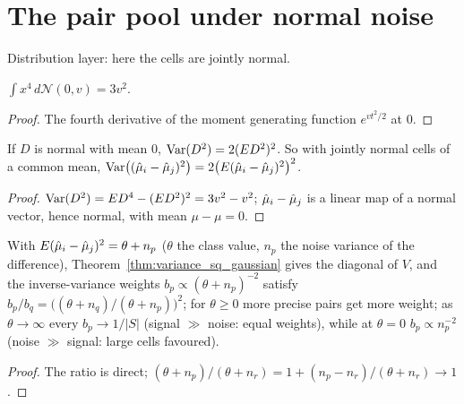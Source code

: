 \section{The pair pool under normal noise}\label{sec:crossed_pool_normal}
Distribution layer: here the cells are jointly normal.

\begin{lemma}\label{lem:gauss_fourth}
  \leanok
  $\int x^4\,d\mathcal N(0, v) = 3v^2$.
\end{lemma}
\begin{proof}
  \leanok
  The fourth derivative of the moment generating function $e^{vt^2/2}$ at $0$.
\end{proof}

\begin{theorem}\label{thm:variance_sq_gaussian}
  \leanok
  If $D$ is normal with mean $0$, $\operatorname{Var}(D^2) = 2(ED^2)^2$. So with jointly normal cells of a
  common mean, $\operatorname{Var}\bigl((\hat\mu_i - \hat\mu_j)^2\bigr) = 2\bigl(E(\hat\mu_i - \hat\mu_j)^2\bigr)^2$.
\end{theorem}
\begin{proof}
  \leanok
  $\operatorname{Var}(D^2) = ED^4 - (ED^2)^2 = 3v^2 - v^2$; $\hat\mu_i - \hat\mu_j$ is a linear map of a normal vector,
  hence normal, with mean $\mu - \mu = 0$.
\end{proof}

\begin{theorem}\label{thm:sqIVWeight}
  \leanok
  With $E(\hat\mu_i - \hat\mu_j)^2 = \theta + n_p$ ($\theta$ the class value, $n_p$ the noise variance of
  the difference), Theorem~\ref{thm:variance_sq_gaussian} gives the diagonal of $V$, and the
  inverse-variance weights $b_p \propto (\theta + n_p)^{-2}$ satisfy
  $b_p/b_q = \bigl((\theta + n_q)/(\theta + n_p)\bigr)^2$; for $\theta \ge 0$ more precise pairs
  get more weight; as $\theta \to \infty$ every $b_p \to 1/|S|$ (signal $\gg$ noise: equal
  weights), while at $\theta = 0$ $b_p \propto n_p^{-2}$ (noise $\gg$ signal: large cells favoured).
\end{theorem}
\begin{proof}
  \leanok
  The ratio is direct; $(\theta + n_p)/(\theta + n_r) = 1 + (n_p - n_r)/(\theta + n_r) \to 1$.
\end{proof}


